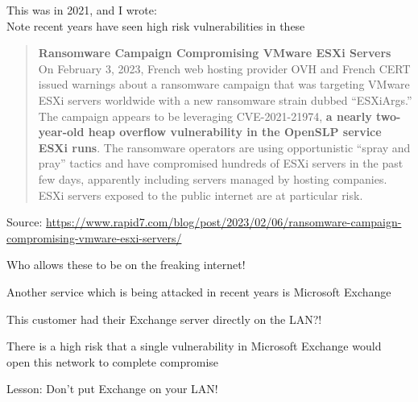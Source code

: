 \documentclass[Screen16to9,17pt]{foils}
\begin{document}
This was in 2021, and I wrote:\\
Note recent years have seen high risk vulnerabilities in these




\begin{quote}{\bf
Ransomware Campaign Compromising VMware ESXi Servers}\\
On February 3, 2023, French web hosting provider OVH and French CERT issued warnings about a ransomware campaign that was targeting VMware ESXi servers worldwide with a new ransomware strain dubbed “ESXiArgs.” The campaign appears to be leveraging CVE-2021-21974, {\bf a nearly two-year-old heap overflow vulnerability in the OpenSLP service ESXi runs}. The ransomware operators are using opportunistic “spray and pray” tactics and have compromised hundreds of ESXi servers in the past few days, apparently including servers managed by hosting companies. ESXi servers exposed to the public internet are at particular risk.
\end{quote}
Source: \url{https://www.rapid7.com/blog/post/2023/02/06/ransomware-campaign-compromising-vmware-esxi-servers/}

\begin{list2}
\item Who allows these to be on the freaking internet!
\end{list2}




Another service which is being attacked in recent years is Microsoft Exchange

This customer had their Exchange server directly on the LAN?!

\begin{list2}
\item There is a high risk that a single vulnerability in Microsoft Exchange would \\
open this network to complete compromise
\end{list2}




\begin{list2}
\item Lesson: Don't put Exchange on your LAN!
\end{list2}
\end{document}
